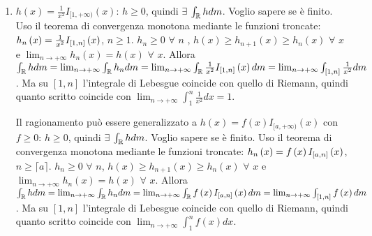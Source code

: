 \documentclass{article}
\begin{document}
\begin{enumerate}
\item $h\left( x\right) =\frac{1}{x^{2}}I_{[1,+\infty )}\left( x\right) $: $%
h\geq 0$, quindi $\exists $ $\int_{%
\mathbb{R}
}hdm$. Voglio sapere se \`{e} finito. Uso il teorema di convergenza monotona
mediante le funzioni troncate: $h_{n}\left( x\right) =\frac{1}{x^{2}}I_{%
\left[ 1,n\right] }\left( x\right) $, $n\geq 1$. $h_{n}\geq 0$ $\forall $ $n$%
, $h\left( x\right) \geq h_{n+1}\left( x\right) \geq h_{n}\left( x\right) $ $%
\forall $ $x$ e $\lim_{n\rightarrow +\infty }h_{n}\left( x\right) =h\left(
x\right) $ $\forall $ $x$. Allora $\int_{%
\mathbb{R}
}hdm=\lim_{n\rightarrow +\infty }\int_{%
\mathbb{R}
}h_{n}dm=\lim_{n\rightarrow +\infty }\int_{%
\mathbb{R}
}\frac{1}{x^{2}}I_{\left[ 1,n\right] }\left( x\right) dm=\lim_{n\rightarrow
+\infty }\int_{\left[ 1,n\right] }\frac{1}{x^{2}}dm$. Ma su $\left[ 1,n%
\right] $ l'integrale di Lebesgue coincide con quello di Riemann, quindi
quanto scritto coincide con $\lim_{n\rightarrow +\infty }\int_{1}^{n}\frac{1%
}{x^{2}}dx=1$.

Il ragionamento pu\`{o} essere generalizzato a $h\left( x\right) =f\left(
x\right) I_{[a,+\infty )}\left( x\right) $ con $f\geq 0$: $h\geq 0$, quindi $%
\exists $ $\int_{%
\mathbb{R}
}hdm$. Voglio sapere se \`{e} finito. Uso il teorema di convergenza monotona
mediante le funzioni troncate: $h_{n}\left( x\right) =f\left( x\right) I_{%
\left[ a,n\right] }\left( x\right) $, $n\geq \lceil a\rceil $. $h_{n}\geq 0$ 
$\forall $ $n$, $h\left( x\right) \geq h_{n+1}\left( x\right) \geq
h_{n}\left( x\right) $ $\forall $ $x$ e $\lim_{n\rightarrow +\infty
}h_{n}\left( x\right) =h\left( x\right) $ $\forall $ $x$. Allora $\int_{%
\mathbb{R}
}hdm=\lim_{n\rightarrow +\infty }\int_{%
\mathbb{R}
}h_{n}dm=\lim_{n\rightarrow +\infty }\int_{%
\mathbb{R}
}f\left( x\right) I_{\left[ a,n\right] }\left( x\right)
dm=\lim_{n\rightarrow +\infty }\int_{\left[ 1,n\right] }f\left( x\right) dm$%
. Ma su $\left[ 1,n\right] $ l'integrale di Lebesgue coincide con quello di
Riemann, quindi quanto scritto coincide con $\lim_{n\rightarrow +\infty
}\int_{1}^{n}f\left( x\right) dx$.
\end{enumerate}
\end{document}
